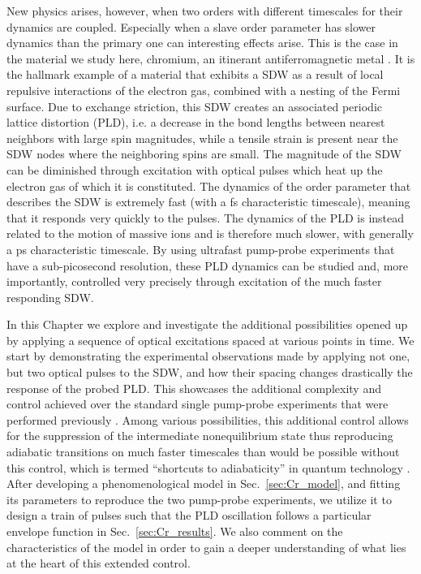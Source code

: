 New physics arises, however, when two orders with different timescales for their dynamics are coupled.
Especially when a slave order parameter has slower dynamics than the primary one can interesting effects arise.
This is the case in the material we study here, chromium, an itinerant antiferromagnetic metal \cite{Kulikov1984,Fawcett1988}.
It is the hallmark example of a material that exhibits a \gls{SDW} as a result of local repulsive interactions of the electron gas, combined with a nesting of the Fermi surface.
Due to exchange striction, this \gls{SDW} creates an associated periodic lattice distortion (PLD), i.e. a decrease in the bond lengths between nearest neighbors with large spin magnitudes, while a tensile strain is present near the \gls{SDW} nodes where the neighboring spins are small. 
The magnitude of the \gls{SDW} can be diminished through excitation with optical pulses which heat up the electron gas of which it is constituted.
The dynamics of the order parameter that describes the \gls{SDW} is extremely fast (with a fs characteristic timescale), meaning that it responds very quickly to the pulses.
The dynamics of the \gls{PLD} is instead related to the motion of massive ions and is therefore much slower, with generally a ps characteristic timescale.
By using ultrafast pump-probe experiments that have a sub-picosecond resolution, these \gls{PLD} dynamics can be studied and, more importantly, controlled very precisely through excitation of the much faster responding \gls{SDW}.

In this Chapter we explore and investigate the additional possibilities opened up by applying a sequence of optical excitations spaced at various points in time.
We start by demonstrating the experimental observations made by applying not one, but two optical pulses to the \gls{SDW}, and how their spacing changes drastically the response of the probed \gls{PLD}.
This showcases the additional complexity and control achieved over the standard single pump-probe experiments that were performed previously \cite{Singer2015prb, Singer2015prb}. 
Among various possibilities, this additional control allows for the suppression of the intermediate nonequilibrium state thus reproducing adiabatic transitions on much faster timescales than would be possible without this control, which is termed ``shortcuts to adiabaticity'' in quantum technology \cite{Torrontegui2013,Deffner2014,Zhou2017}.
After developing a phenomenological model in Sec.~\ref{sec:Cr_model}, and fitting its parameters to reproduce the two pump-probe experiments, we utilize it to design a train of pulses such that the \gls{PLD} oscillation follows a particular envelope function in Sec.~\ref{sec:Cr_results}.
We also comment on the characteristics of the model in order to gain a deeper understanding of what lies at the heart of this extended control. 

